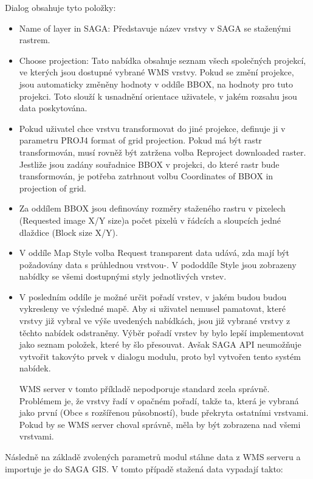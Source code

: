 \documentclass[a4paper,12pt]{article}
\begin{document}
Dialog obsahuje tyto položky:

\begin{itemize}
\item Name of layer in SAGA: Představuje název vrstvy v SAGA se staženými rastrem.
\item Choose projection: Tato nabídka obsahuje seznam všech společných projekcí, ve kterých jsou dostupné vybrané WMS vrstvy. Pokud se změní projekce, jsou automaticky změněny hodnoty v oddíle BBOX, na hodnoty pro tuto projekci. Toto slouží k usnadnění orientace uživatele, v jakém rozsahu jsou data poskytována. 
\item Pokud uživatel chce vrstvu transformovat do jiné projekce, definuje ji v parametru PROJ4 format of grid projection. Pokud má být rastr transformován, musí rovněž být zatržena volba Reproject downloaded raster. Jestliže jsou zadány souřadnice BBOX v projekci, do které rastr bude transformován, je potřeba zatrhnout volbu Coordinates of BBOX in projection of grid. 
\item Za oddílem BBOX jsou definovány rozměry staženého rastru v pixelech (Requested image X/Y size)a počet pixelů v řádcích a sloupcích jedné dlaždice (Block size X/Y). 
\item V oddíle Map Style volba Request transparent data udává, zda mají být požadovány data s průhlednou vrstvou-. 
V pododdíle Style jsou zobrazeny nabídky se všemi dostupnými styly jednotlivých vrstev.  

\item V posledním oddíle je možné určit pořadí vrstev, v jakém budou budou vykresleny ve výsledné mapě. Aby si uživatel nemusel pamatovat, které vrstvy již vybral ve výše uvedených nabídkách, jsou již vybrané vrstvy z těchto nabídek odstraněny.  Výběr pořadí vrstev by bylo lepší implementovat jako seznam položek, které by šlo přesouvat. Avšak SAGA API neumožňuje vytvořit takovýto prvek v dialogu modulu, proto byl vytvořen tento systém nabídek.

WMS server v tomto příkladě nepodporuje standard zcela správně. Problémem je, že vrstvy řadí v opačném pořadí, takže ta, která je vybraná jako první (Obce s rozšířenou působností), bude překryta ostatními vrstvami. Pokud by se WMS server choval správně, měla by být zobrazena nad všemi vrstvami. 
\end{itemize}

Následně na základě zvolených parametrů modul stáhne data z WMS serveru a importuje je do SAGA GIS. V tomto případě stažená data vypadají takto:
\end{document}
